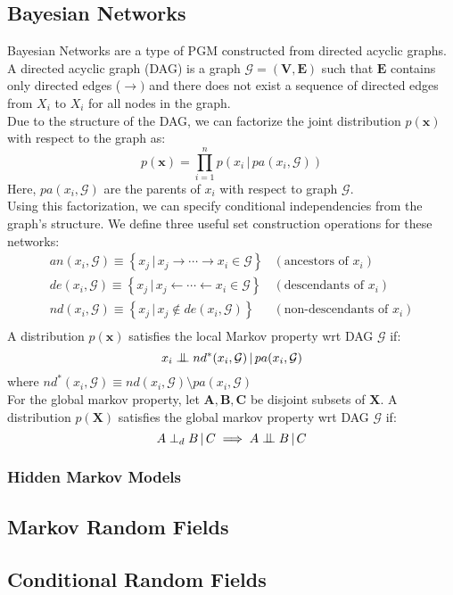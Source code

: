 \subsection{Bayesian Networks}
Bayesian Networks are a type of PGM constructed from directed acyclic graphs.
A directed acyclic graph (DAG) is a graph $\mathcal{G} = (\mathbf{V}, \mathbf{E})$
such that $\mathbf{E}$ contains only directed edges ($\rightarrow)$ and there
does not exist a sequence of directed edges from $X_i$ to $X_i$ for all nodes
in the graph.\\
Due to the structure of the DAG, we can factorize the joint distribution
$p(\mathbf{x})$ with respect to the graph as:
\begin{equation}
  p(\mathbf{x}) = \prod_{i=1}^n p(x_i \, | \, pa(x_i, \mathcal{G}))
\end{equation}
Here, $pa(x_i, \mathcal{G})$ are the parents of $x_i$ with respect to graph $\mathcal{G}$.\\
Using this factorization, we can specify conditional independencies from the graph's structure.
We define three useful set construction operations for these networks:
\begin{equation}
  \begin{matrix}
    an(x_i, \mathcal{G}) \equiv \left\{ x_j \, | \, x_j \rightarrow \cdots \rightarrow x_i \in \mathcal{G} \right\} & (\textrm{ancestors of } x_i)\\
    de(x_i, \mathcal{G}) \equiv \left\{ x_j \, | \, x_j \leftarrow \cdots \leftarrow x_i \in \mathcal{G} \right\} & (\textrm{descendants of } x_i)\\
    nd(x_i, \mathcal{G}) \equiv \left\{ x_j \, | \, x_j \notin de(x_i, \mathcal{G}) \right\} & (\textrm{non-descendants of } x_i)\\
  \end{matrix}
\end{equation}
A distribution $p(\mathbf{x})$ satisfies the local Markov property wrt DAG
$\mathcal{G}$ if:
\begin{equation}
  x_i \CI nd^*(x_i, \mathcal{G}) \, | \, pa(x_i, \mathcal{G})
\end{equation}
where $nd^*(x_i, \mathcal{G}) \equiv nd(x_i, \mathcal{G}) \setminus pa(x_i, \mathcal{G})$\\
For the global markov property, let $\mathbf{A}, \mathbf{B}, \mathbf{C}$ be disjoint subsets
of $\mathbf{X}$.  A distribution $p(\mathbf{X})$ satisfies the global markov property
wrt DAG $\mathcal{G}$ if:
\begin{equation}
  A \perp_d B \, | \, C \implies A \CI B \, | \, C
\end{equation}
\subsubsection{Hidden Markov Models}
\subsection{Markov Random Fields}
\subsection{Conditional Random Fields}
